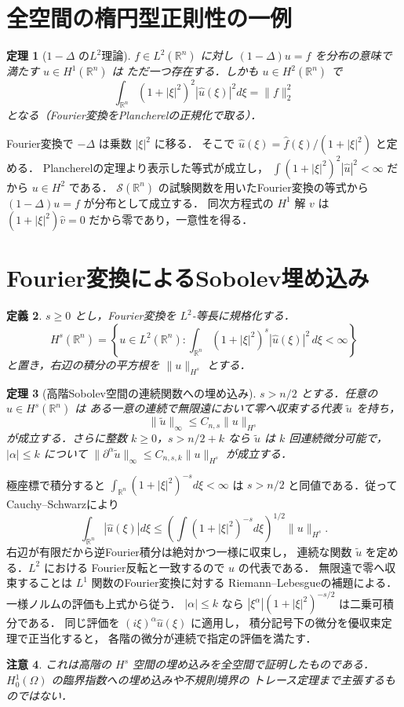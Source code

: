 \documentclass[a5paper,10pt,onecolumn]{jsarticle}
\makeatletter
\theoremstyle{mathnotetheorem}
\newtheorem{theorem}{定理}[section]
\newtheorem{definition}[theorem]{定義}
\newtheorem{remark}[theorem]{注意}
\renewcommand{\proofname}{証明}
\renewenvironment{proof}[1][\proofname]{%
  \par\pushQED{\qed}\normalfont\topsep4\p@\@plus2\p@\relax
  \trivlist\item[\hskip\labelsep\bfseries #1]\ignorespaces
}{\popQED\endtrivlist\@endpefalse}
\newcommand{\norm}[1]{\lVert #1\rVert}
\makeatother
\begin{document}
\section{全空間の楕円型正則性の一例}
\begin{theorem}[$1-\Delta$ の$L^2$理論]
$f\in L^2(\mathbb R^n)$ に対し
$(1-\Delta)u=f$ を分布の意味で満たす $u\in H^1(\mathbb R^n)$ は
ただ一つ存在する．しかも $u\in H^2(\mathbb R^n)$ で
\[
 \int_{\mathbb R^n}(1+|\xi|^2)^2|\widehat u(\xi)|^2d\xi
 =\norm f_2^2
\]
となる（Fourier変換をPlancherelの正規化で取る）．
\end{theorem}
\begin{proof}
Fourier変換で $-\Delta$ は乗数 $|\xi|^2$ に移る．
そこで $\widehat u(\xi)=\widehat f(\xi)/(1+|\xi|^2)$ と定める．
Plancherelの定理より表示した等式が成立し，
$\int(1+|\xi|^2)^2|\widehat u|^2<\infty$ だから
$u\in H^2$ である．
$\mathcal S(\mathbb R^n)$ の試験関数を用いたFourier変換の等式から
$(1-\Delta)u=f$ が分布として成立する．
同次方程式の $H^1$ 解 $v$ は
$(1+|\xi|^2)\widehat v=0$ だから零であり，一意性を得る．
\end{proof}

\section{Fourier変換によるSobolev埋め込み}
\begin{definition}
$s\ge0$ とし，Fourier変換を $L^2$-等長に規格化する．
\[
 H^s(\mathbb R^n)=\left\{u\in L^2(\mathbb R^n):
 \int_{\mathbb R^n}(1+|\xi|^2)^s|\widehat u(\xi)|^2\,d\xi<\infty\right\}
\]
と置き，右辺の積分の平方根を $\norm u_{H^s}$ とする．
\end{definition}
\begin{theorem}[高階Sobolev空間の連続関数への埋め込み]
$s>n/2$ とする．任意の $u\in H^s(\mathbb R^n)$ は
ある一意の連続で無限遠において零へ収束する代表 $\widetilde u$ を持ち，
\[
 \norm{\widetilde u}_\infty\le C_{n,s}\norm u_{H^s}
\]
が成立する．さらに整数 $k\ge0$，$s>n/2+k$ なら
$\widetilde u$ は $k$ 回連続微分可能で，$|\alpha|\le k$ について
$\norm{\partial^\alpha\widetilde u}_\infty\le C_{n,s,k}\norm u_{H^s}$
が成立する．
\end{theorem}
\begin{proof}
極座標で積分すると
$\int_{\mathbb R^n}(1+|\xi|^2)^{-s}d\xi<\infty$ は
$s>n/2$ と同値である．従ってCauchy--Schwarzにより
\[
 \int_{\mathbb R^n}|\widehat u(\xi)|d\xi
 \le\left(\int(1+|\xi|^2)^{-s}d\xi\right)^{1/2}
 \norm u_{H^s}.
\]
右辺が有限だから逆Fourier積分は絶対かつ一様に収束し，
連続な関数 $\widetilde u$ を定める．$L^2$ における
Fourier反転と一致するので $u$ の代表である．
無限遠で零へ収束することは $L^1$ 関数のFourier変換に対する
Riemann--Lebesgueの補題による．一様ノルムの評価も上式から従う．
$|\alpha|\le k$ なら
$|\xi^\alpha|(1+|\xi|^2)^{-s/2}$ は二乗可積分である．
同じ評価を $(i\xi)^\alpha\widehat u(\xi)$ に適用し，
積分記号下の微分を優収束定理で正当化すると，
各階の微分が連続で指定の評価を満たす．
\end{proof}
\begin{remark}
これは高階の $H^s$ 空間の埋め込みを全空間で証明したものである．
$H_0^1(\Omega)$ の臨界指数への埋め込みや不規則境界の
トレース定理まで主張するものではない．
\end{remark}
\end{document}
